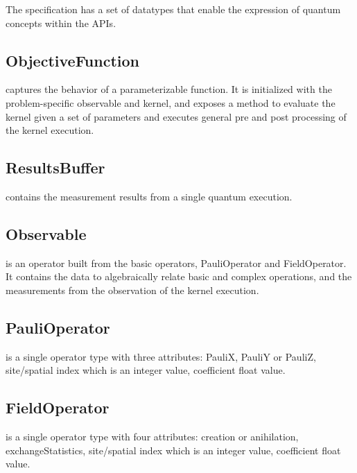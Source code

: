 The \qcor specification has a set of datatypes that enable the expression of quantum concepts within the \qcor \ac{API}s.\\

\subsection{\textbf{ObjectiveFunction}}\label{subsec:ObjectiveFunction}
 captures the behavior of a parameterizable function. It is initialized with the problem-specific observable and kernel, and exposes a method to evaluate the kernel given a set of parameters and executes general pre and post processing of the kernel execution.\\

\subsection{\textbf{ResultsBuffer}}\label{subsec:ResultsBuffer}
 contains the measurement results from a single quantum execution.\\

\subsection{\textbf{Observable}}\label{subsec:Observable}
 is an operator built from the basic operators, PauliOperator and FieldOperator. It contains the data to algebraically relate basic and complex operations, and the measurements from the observation of the kernel execution.\\

\subsection{\textbf{PauliOperator}}\label{subsec:PauliOperator}
 is a single operator type with three attributes: PauliX, PauliY or PauliZ, site/spatial index which is an integer value, coefficient float value.\\

\subsection{\textbf{FieldOperator}}\label{subsec:FieldOperator}
 is a single operator type with four attributes: creation or anihilation, exchangeStatistics, site/spatial index which is an integer value, coefficient float value.\\


